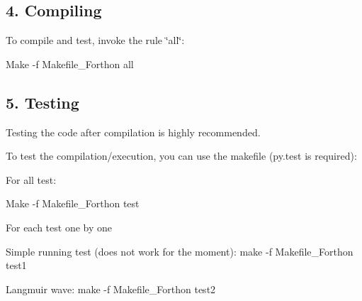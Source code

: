 \subsection*{4. Compiling }

To compile and test, invoke the rule \char`\"{}all\char`\"{}\+:


\begin{DoxyItemize}
\item Make -\/f Makefile\+\_\+\+Forthon all
\end{DoxyItemize}

\subsection*{5. Testing }

Testing the code after compilation is highly recommended.

To test the compilation/execution, you can use the makefile (py.\+test is required)\+:

For all test\+:
\begin{DoxyItemize}
\item Make -\/f Makefile\+\_\+\+Forthon test
\end{DoxyItemize}

For each test one by one
\begin{DoxyItemize}
\item Simple running test (does not work for the moment)\+: make -\/f Makefile\+\_\+\+Forthon test1
\item Langmuir wave\+: make -\/f Makefile\+\_\+\+Forthon test2 
\end{DoxyItemize}